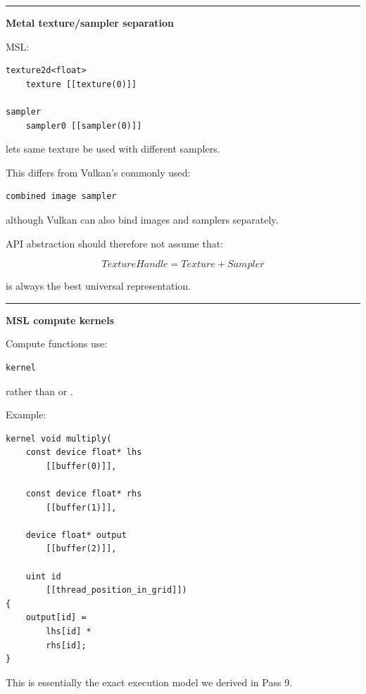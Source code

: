 \begin{center}\rule{0.5\linewidth}{0.5pt}\end{center}

\textbf{Metal texture/sampler separation}

MSL:

\begin{verbatim}
texture2d<float>
    texture [[texture(0)]]

sampler
    sampler0 [[sampler(0)]]
\end{verbatim}

lets same texture be used with different samplers.

This differs from Vulkan's commonly used:

\begin{verbatim}
combined image sampler
\end{verbatim}

although Vulkan can also bind images and samplers separately.

API abstraction should therefore not assume that:

\[
TextureHandle
=
Texture+Sampler
\]

is always the best universal representation.

\begin{center}\rule{0.5\linewidth}{0.5pt}\end{center}

\textbf{MSL compute kernels}

Compute functions use:

\begin{verbatim}
kernel
\end{verbatim}

rather than  or .

Example:

\begin{verbatim}
kernel void multiply(
    const device float* lhs
        [[buffer(0)]],

    const device float* rhs
        [[buffer(1)]],

    device float* output
        [[buffer(2)]],

    uint id
        [[thread_position_in_grid]])
{
    output[id] =
        lhs[id] *
        rhs[id];
}
\end{verbatim}

This is essentially the exact execution model we derived in Pass 9.

